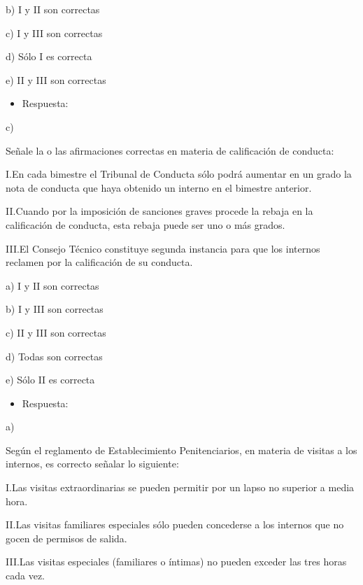 \documentclass[letterpaper, 11pt]{article}
\begin{document}
b) I y II son correctas

c) I y III son correctas

d) Sólo I es correcta

e) II y III son correctas


\begin{itemize}
\item Respuesta:
\end{itemize}

c)



Señale la o las afirmaciones correctas en materia de calificación de
conducta:


I.En cada bimestre el Tribunal de Conducta sólo podrá aumentar en un
grado la nota de conducta que haya obtenido un interno en el bimestre
anterior.



II.Cuando por la imposición de sanciones graves procede la rebaja en
la calificación de conducta, esta rebaja puede ser uno o más grados.



III.El Consejo Técnico constituye segunda instancia para que los
internos reclamen por la calificación de su conducta.



a) I y II son correctas

b) I y III son correctas

c) II y III son correctas

d) Todas son correctas

e) Sólo II es correcta


\begin{itemize}
\item Respuesta:
\end{itemize}

a)



Según el reglamento de Establecimiento Penitenciarios, en materia de
visitas a los internos, es correcto señalar lo siguiente:


I.Las visitas extraordinarias se pueden permitir por un lapso no
superior a media hora.



II.Las visitas familiares especiales sólo pueden concederse a los
internos que no gocen de permisos de salida.



III.Las visitas especiales (familiares o íntimas) no pueden exceder
las tres horas cada vez.
\end{document}
